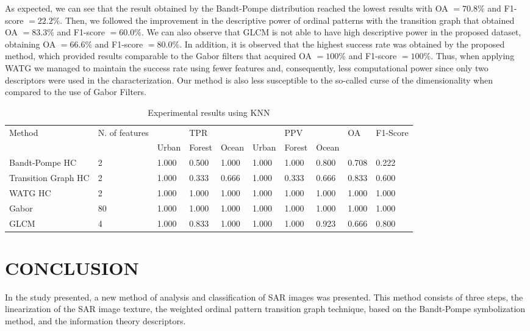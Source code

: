\documentclass[journal]{IEEEtran}
\begin{document}
As expected, we can see that the result obtained by the Bandt-Pompe distribution reached the lowest results with OA $= 70.8\%$ and F1-score $= 22.2\%$.
Then, we followed the improvement in the descriptive power of ordinal patterns with the transition graph that obtained OA $= 83.3\%$ and F1-score $= 60.0\%$.
We can also observe that GLCM is not able to have high descriptive power in the proposed dataset, obtaining OA $= 66.6\%$ and F1-score $= 80.0\%$.
In addition, it is observed that the highest success rate was obtained by the proposed method, which provided results comparable to the Gabor filters that acquired OA $= 100\%$ and F1-score $= 100\%$.
Thus, when applying WATG we managed to maintain the success rate using fewer features and, consequently, less computational power since only two descriptors were used in the characterization. {\color{red}Our method is also less susceptible to the so-called curse of the dimensionality when compared to the use of Gabor Filters.}

\begin{table}[!h]
\centering
\caption{Experimental results using KNN}
\label{tab:result1}
\begin{tabular}{|l|l|lll|lll|l|l|}
\hline
Method      & N. of features         &       & TPR   &       &       & PPV    &       & OA  & F1-Score \\ \cline{3-8} 
                 &   & Urban & Forest & Ocean & Urban & Forest & Ocean & &  \\\hline
Bandt-Pompe HC   & 2 & 1.000 & 0.500  & 1.000 & 1.000 & 1.000  & 0.800 & 0.708 & 0.222  \\ 
Transition Graph HC & 2  & 1.000 & 0.333  & 0.666 & 1.000 & 0.333  & 0.666 & 0.833 & 0.600 \\
WATG HC         & 2  & 1.000 & 1.000  & 1.000 & 1.000 & 1.000  & 1.000 & 1.000 & 1.000 \\ 
Gabor           & 80  & 1.000 & 1.000  & 1.000 & 1.000 & 1.000  & 1.000 & 1.000 & 1.000\\
GLCM            & 4   & 1.000 & 0.833  & 1.000 & 1.000 & 1.000  & 0.923 & 0.666 & 0.800\\
\hline
\end{tabular}
\end{table}

\section{CONCLUSION}\label{Conclusion}

In the study presented, a new method of analysis and classification of SAR images was presented.
This method consists of three steps, the linearization of the SAR image texture, the weighted ordinal pattern transition graph technique, based on the Bandt-Pompe symbolization method, and the information theory descriptors.
\end{document}

